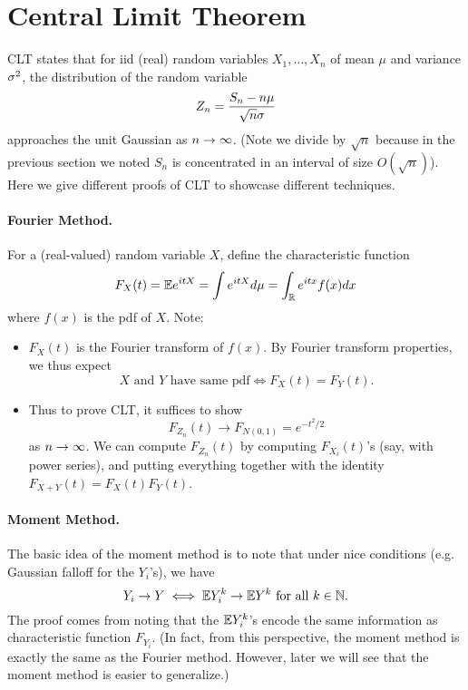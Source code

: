 \section*{Central Limit Theorem}

CLT states that for iid (real) random variables $X_1, \dots, X_n$ of mean $\mu$ and variance $\sigma^2$, the distribution of the random variable
\[
    Z_n = \frac{S_n - n\mu}{\sqrt{n}\sigma}
\]
approaches the unit Gaussian as $n \to \infty$. (Note we divide by $\sqrt{n}$ because in the previous section we noted $S_n$ is concentrated in an interval of size $O(\sqrt{n})$). Here we give different proofs of CLT to showcase different techniques.

\paragraph{Fourier Method.} For a (real-valued) random variable $X$, define the characteristic function
\[
    F_X(t) = {\mathbb E} e^{itX} = \int e^{itX} d\mu = \int_{\mathbb R} e^{itx} f(x) dx
\]
where $f(x)$ is the pdf of $X$. Note:
\begin{itemize}
    \item $F_X(t)$ is the Fourier transform of $f(x)$. By Fourier transform properties, we thus expect
    \[
        \text{$X$ and $Y$ have same pdf} \iff F_X(t) = F_Y(t).
    \]
    \item Thus to prove CLT, it suffices to show
    \[
        F_{Z_n}(t) \to F_{N(0,1)} = e^{-t^2/2}
    \]
    as $n \to \infty$. We can compute $F_{Z_n}(t)$ by computing $F_{X_i}(t)$'s (say, with power series), and putting everything together with the identity $F_{X+Y}(t) = F_{X}(t)F_{Y}(t)$.
\end{itemize}

\paragraph{Moment Method.} The basic idea of the moment method is to note that under nice conditions (e.g. Gaussian falloff for the $Y_i$'s), we have
\[
    Y_i \to Y \iff {\mathbb E} Y_i^k \to {\mathbb E} Y^k \text{ for all } k \in {\mathbb N}.
\]
The proof comes from noting that the ${\mathbb E} Y_i^k$'s encode the same information as characteristic function $F_{Y_i}$. (In fact, from this perspective, the moment method is exactly the same as the Fourier method. However, later we will see that the moment method is easier to generalize.)

